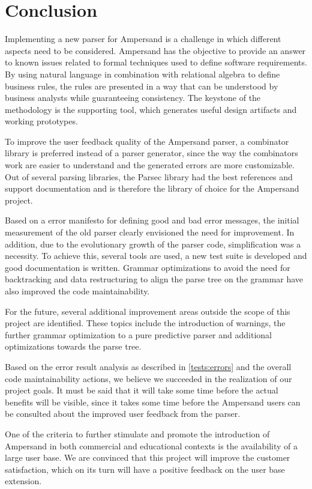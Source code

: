 
\section{Conclusion}
\label{sec:conclusion}
Implementing a new parser for Ampersand is a challenge in which different aspects need to be considered.
Ampersand has the objective to provide an answer to known issues related to formal techniques used to define software requirements.
By using natural language in combination with relational algebra to define business rules, the rules are presented in a way that can be understood by business analysts while guaranteeing consistency.
The keystone of the methodology is the supporting tool, which generates useful design artifacts and working prototypes.

To improve the user feedback quality of the Ampersand parser, a combinator library is preferred instead of a parser generator, since the way the combinators work are easier to understand and the generated errors are more customizable.
Out of several parsing libraries, the Parsec library had the best references and support documentation and is therefore the library of choice for the Ampersand project.

Based on a error manifesto for defining good and bad error messages, the initial measurement of the old parser clearly envisioned the need for improvement.
In addition, due to the evolutionary growth of the parser code, simplification was a necessity.
To achieve this, several tools are used, a new test suite is developed and good documentation is written.
Grammar optimizations to avoid the need for backtracking and data restructuring to align the parse tree on the grammar have also improved the code maintainability.

For the future, several additional improvement areas outside the scope of this project are identified.
These topics include the introduction of warnings, the further grammar optimization to a pure predictive parser and additional optimizations towards the parse tree.

Based on the error result analysis as described in \autoref{tests:errors} and the overall code maintainability actions, we believe we succeeded in the realization of our project goals.
It must be said that it will take some time before the actual benefits will be visible, since it takes some time before the Ampersand users can be consulted about the improved user feedback from the parser.

One of the criteria to further stimulate and promote the introduction of Ampersand in both commercial and educational contexts is the availability of a large user base.
We are convinced that this project will improve the customer satisfaction, which on its turn will have a positive feedback on the user base extension.
